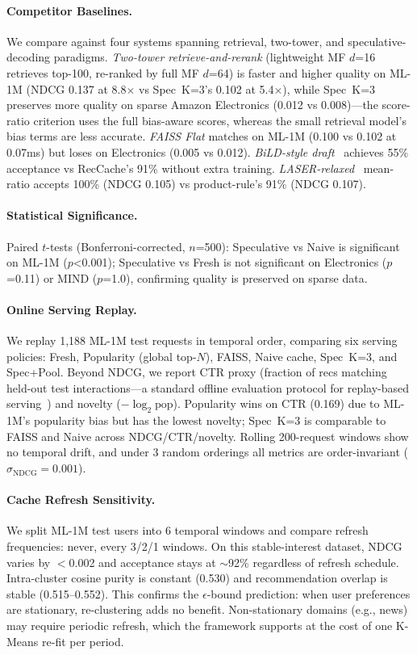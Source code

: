 \documentclass[sigconf,nonacm=false]{acmart}
\begin{document}
\paragraph{Competitor Baselines.}
We compare against four systems spanning retrieval, two-tower, and speculative-decoding paradigms. \emph{Two-tower retrieve-and-rerank} (lightweight MF $d$=16 retrieves top-100, re-ranked by full MF $d$=64) is faster and higher quality on ML-1M (NDCG 0.137 at 8.8$\times$ vs Spec~K=3's 0.102 at 5.4$\times$), while Spec~K=3 preserves more quality on sparse Amazon Electronics (0.012 vs 0.008)---the score-ratio criterion uses the full bias-aware scores, whereas the small retrieval model's bias terms are less accurate. \emph{FAISS Flat} matches on ML-1M (0.100 vs 0.102 at 0.07ms) but loses on Electronics (0.005 vs 0.012). \emph{BiLD-style draft}~\cite{leviathan2023} achieves 55\% acceptance vs RecCache's 91\% without extra training. \emph{LASER-relaxed}~\cite{laser2025} mean-ratio accepts 100\% (NDCG 0.105) vs product-rule's 91\% (NDCG 0.107).

\paragraph{Statistical Significance.}
Paired $t$-tests (Bonferroni-corrected, $n$=500): Speculative vs Naive is significant on ML-1M ($p$<0.001); Speculative vs Fresh is not significant on Electronics ($p$=0.11) or MIND ($p$=1.0), confirming quality is preserved on sparse data.

\paragraph{Online Serving Replay.}
We replay 1,188 ML-1M test requests in temporal order, comparing six serving policies: Fresh, Popularity (global top-$N$), FAISS, Naive cache, Spec~K=3, and Spec+Pool. Beyond NDCG, we report CTR proxy (fraction of recs matching held-out test interactions---a standard offline evaluation protocol for replay-based serving~\cite{he2017ncf}) and novelty ($-\log_2 \text{pop}$). Popularity wins on CTR (0.169) due to ML-1M's popularity bias but has the lowest novelty; Spec~K=3 is comparable to FAISS and Naive across NDCG/CTR/novelty. Rolling 200-request windows show no temporal drift, and under 3 random orderings all metrics are order-invariant ($\sigma_{\text{NDCG}}{=}0.001$).

\paragraph{Cache Refresh Sensitivity.}
We split ML-1M test users into 6 temporal windows and compare refresh frequencies: never, every 3/2/1 windows. On this stable-interest dataset, NDCG varies by $<$0.002 and acceptance stays at $\sim$92\% regardless of refresh schedule. Intra-cluster cosine purity is constant (0.530) and recommendation overlap is stable (0.515--0.552). This confirms the $\epsilon$-bound prediction: when user preferences are stationary, re-clustering adds no benefit. Non-stationary domains (e.g., news) may require periodic refresh, which the framework supports at the cost of one K-Means re-fit per period.
\end{document}
